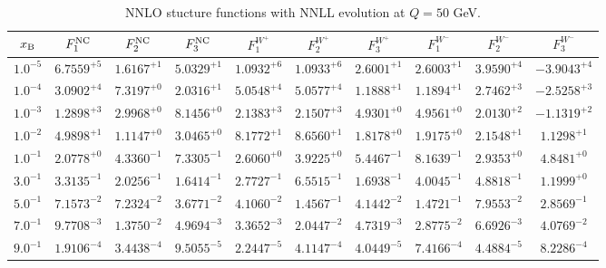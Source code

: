 \begin{table}[h]
\begin{adjustbox}{width=\textwidth}
\begin{tabular}{|c||c|c|c|c|c|c|c|c|c|}
\hline
$x_{\rm B}$ & $F_1^{\rm NC}$ & $F_2^{\rm NC}$ & $F_3^{\rm NC}$ & $F_1^{W^+}$ & $F_2^{W^+}$ & $F_3^{W^+}$ & $F_1^{W^-}$ & $F_2^{W^-}$ & $F_3^{W^-}$ \\
\hline
$ 1.0^{-5}$ & $ 6.7559^{+5}$ & $ 1.6167^{+1}$ & $ 5.0329^{+1}$ & $ 1.0932^{+6}$ & $ 1.0933^{+6}$ & $ 2.6001^{+1}$ & $ 2.6003^{+1}$ & $ 3.9590^{+4}$ & $-3.9043^{+4}$ \\
$ 1.0^{-4}$ & $ 3.0902^{+4}$ & $ 7.3197^{+0}$ & $ 2.0316^{+1}$ & $ 5.0548^{+4}$ & $ 5.0577^{+4}$ & $ 1.1888^{+1}$ & $ 1.1894^{+1}$ & $ 2.7462^{+3}$ & $-2.5258^{+3}$ \\
$ 1.0^{-3}$ & $ 1.2898^{+3}$ & $ 2.9968^{+0}$ & $ 8.1456^{+0}$ & $ 2.1383^{+3}$ & $ 2.1507^{+3}$ & $ 4.9301^{+0}$ & $ 4.9561^{+0}$ & $ 2.0130^{+2}$ & $-1.1319^{+2}$ \\
$ 1.0^{-2}$ & $ 4.9898^{+1}$ & $ 1.1147^{+0}$ & $ 3.0465^{+0}$ & $ 8.1772^{+1}$ & $ 8.6560^{+1}$ & $ 1.8178^{+0}$ & $ 1.9175^{+0}$ & $ 2.1548^{+1}$ & $ 1.1298^{+1}$ \\
$ 1.0^{-1}$ & $ 2.0778^{+0}$ & $ 4.3360^{-1}$ & $ 7.3305^{-1}$ & $ 2.6060^{+0}$ & $ 3.9225^{+0}$ & $ 5.4467^{-1}$ & $ 8.1639^{-1}$ & $ 2.9353^{+0}$ & $ 4.8481^{+0}$ \\
$ 3.0^{-1}$ & $ 3.3135^{-1}$ & $ 2.0256^{-1}$ & $ 1.6414^{-1}$ & $ 2.7727^{-1}$ & $ 6.5515^{-1}$ & $ 1.6938^{-1}$ & $ 4.0045^{-1}$ & $ 4.8818^{-1}$ & $ 1.1999^{+0}$ \\
$ 5.0^{-1}$ & $ 7.1573^{-2}$ & $ 7.2324^{-2}$ & $ 3.6771^{-2}$ & $ 4.1060^{-2}$ & $ 1.4567^{-1}$ & $ 4.1442^{-2}$ & $ 1.4721^{-1}$ & $ 7.9553^{-2}$ & $ 2.8569^{-1}$ \\
$ 7.0^{-1}$ & $ 9.7708^{-3}$ & $ 1.3750^{-2}$ & $ 4.9694^{-3}$ & $ 3.3652^{-3}$ & $ 2.0447^{-2}$ & $ 4.7319^{-3}$ & $ 2.8775^{-2}$ & $ 6.6926^{-3}$ & $ 4.0769^{-2}$ \\
$ 9.0^{-1}$ & $ 1.9106^{-4}$ & $ 3.4438^{-4}$ & $ 9.5055^{-5}$ & $ 2.2447^{-5}$ & $ 4.1147^{-4}$ & $ 4.0449^{-5}$ & $ 7.4166^{-4}$ & $ 4.4884^{-5}$ & $ 8.2286^{-4}$ \\
\hline
\end{tabular}
\end{adjustbox}\caption{NNLO stucture functions with NNLL evolution at $Q = 50$ GeV.}
\label{tab:N2LO-Q50}
\end{table}


